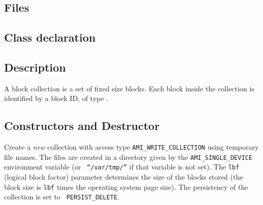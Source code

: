    \etabb




\subsection{Files}
   \btabb
        {}
   \etabb

\subsection{Class declaration}

   \btabb
         {}
   \etabb

\subsection{Description}

A block collection is a set of fixed size blocks. Each block inside the
collection is identified by a block ID, of type .

\subsection{Constructors and Destructor}

   \btabb
        
         {Create a {\em new}
        collection with access type {\tt AMI\_WRITE\_COLLECTION} using
        temporary file names. The files are created in a directory given by
        the {\tt AMI\_SINGLE\_DEVICE} environment variable (or {\tt
        ``/var/tmp/''} if that variable is not set).  The {\tt lbf}
        (logical block factor) parameter determines the size of the blocks
        stored (the block size is {\tt lbf} times the operating system
        page size). The persistency of the collection is set to {\tt
        PERSIST\_DELETE}.}

